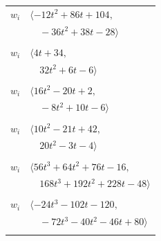 \documentclass[11pt]{article}
\begin{document}
\begin{longtable}{@{}ll@{}}
$w_i$ & $\langle -12t^{2}+86t+104,$\\
 & $\quad -36t^{2}+38t-28\rangle$\\
\addlinespace[2pt]
\multicolumn{2}{@{}p{0.97\textwidth}@{}}{$i=10$, $D_i=1$, $\rho_{ij}$: $1{:}3, \allowbreak 2{:}1, \allowbreak 7{:}1, \allowbreak 14{:}1, \allowbreak 21{:}1, \allowbreak 23{:}3, \allowbreak 25{:}1, \allowbreak 26{:}3, \allowbreak 31{:}3, \allowbreak 45{:}3, \allowbreak 49{:}3, \allowbreak 52{:}2$}\\
$w_i$ & $\langle 4t+34,$\\
 & $\quad 32t^{2}+6t-6\rangle$\\
\addlinespace[2pt]
\multicolumn{2}{@{}p{0.97\textwidth}@{}}{$i=11$, $D_i=1$, $\rho_{ij}$: $6{:}3, \allowbreak 13{:}2, \allowbreak 25{:}1, \allowbreak 28{:}3, \allowbreak 33{:}1, \allowbreak 47{:}3, \allowbreak 49{:}3, \allowbreak 50{:}1, \allowbreak 55{:}3$}\\
$w_i$ & $\langle 16t^{2}-20t+2,$\\
 & $\quad -8t^{2}+10t-6\rangle$\\
\addlinespace[2pt]
\multicolumn{2}{@{}p{0.97\textwidth}@{}}{$i=12$, $D_i=2$, $\rho_{ij}$: $1{:}2, \allowbreak 5{:}2, \allowbreak 7{:}1, \allowbreak 20{:}2, \allowbreak 37{:}3, \allowbreak 41{:}2, \allowbreak 43{:}1, \allowbreak 44{:}3, \allowbreak 46{:}2, \allowbreak 48{:}3, \allowbreak 50{:}3, \allowbreak 53{:}1, \allowbreak 54{:}3, \allowbreak 55{:}2$}\\
$w_i$ & $\langle 10t^{2}-21t+42,$\\
 & $\quad 20t^{2}-3t-4\rangle$\\
\addlinespace[2pt]
\multicolumn{2}{@{}p{0.97\textwidth}@{}}{$i=13$, $D_i=16$, $\rho_{ij}$: $11{:}2, \allowbreak 31{:}2, \allowbreak 34{:}2, \allowbreak 44{:}2, \allowbreak 47{:}2, \allowbreak 48{:}2, \allowbreak 49{:}2$}\\
$w_i$ & $\langle 56t^{3}+64t^{2}+76t-16,$\\
 & $\quad 168t^{3}+192t^{2}+228t-48\rangle$\\
\addlinespace[2pt]
\multicolumn{2}{@{}p{0.97\textwidth}@{}}{$i=14$, $D_i=1$, $\rho_{ij}$: $3{:}1, \allowbreak 6{:}3, \allowbreak 10{:}3, \allowbreak 30{:}1, \allowbreak 31{:}1, \allowbreak 36{:}1, \allowbreak 39{:}3, \allowbreak 40{:}3, \allowbreak 43{:}3, \allowbreak 49{:}2$}\\
$w_i$ & $\langle -24t^{3}-102t-120,$\\
 & $\quad -72t^{3}-40t^{2}-46t+80\rangle$\\
\addlinespace[2pt]
\multicolumn{2}{@{}p{0.97\textwidth}@{}}{$i=15$, $D_i=1$, $\rho_{ij}$: $5{:}3, \allowbreak 6{:}3, \allowbreak 16{:}2, \allowbreak 23{:}1, \allowbreak 24{:}1, \allowbreak 28{:}2, \allowbreak 35{:}3, \allowbreak 37{:}2, \allowbreak 38{:}1, \allowbreak 52{:}2, \allowbreak 55{:}1$}\\

\end{longtable}
\end{document}
